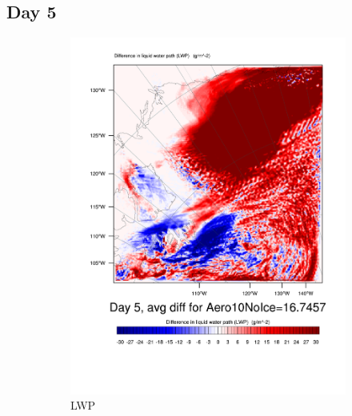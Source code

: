 \subsection{Day 5}
\begin{figure}[hb]
\centering
	\begin{subfigure}{0.40\textwidth}
		\centering
		\includegraphics[width=\textwidth]{results/aero10ni/Diff_LWP_Day5Aero10NoIce.pdf}
		\caption{LWP}
		\label{subfig:LWPr4Day5}
	\end{subfigure}
	\quad
	\begin{subfigure}{0.40\textwidth}
		\centering

\end{subfigure}
\end{figure}
